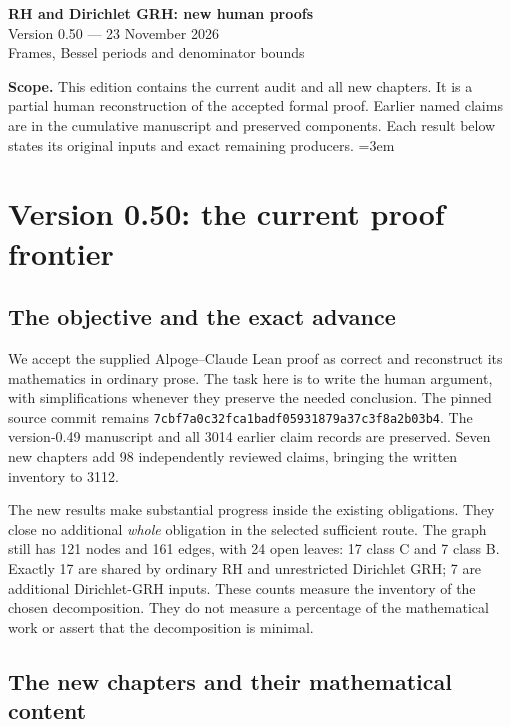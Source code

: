 \documentclass[11pt,a4paper]{article}
\numberwithin{equation}{section}
\theoremstyle{remark}\newtheorem{remark}[theorem]{Remark}
\begin{document}
\begin{center}
{\LARGE\bfseries RH and Dirichlet GRH: new human proofs}\\[7pt]
{\large Version 0.50 --- 23 November 2026}\\[5pt]
{\large Frames, Bessel periods and denominator bounds}
\end{center}
\textbf{Scope.} This edition contains the current audit and all new chapters.
It is a partial human reconstruction of the accepted formal proof.
Earlier named claims are in the cumulative manuscript and preserved components.
Each result below states its original inputs and exact remaining producers.
\setcounter{tocdepth}{1}
\tableofcontents
\clearpage
\begingroup\emergencystretch=3em
\section{Version 0.50: the current proof frontier}
\label{sec:dependency-audit-v50}

\subsection{The objective and the exact advance}

We accept the supplied Alpoge--Claude Lean proof as correct and reconstruct
its mathematics in ordinary prose. The task here is to write the human
argument, with simplifications whenever they preserve the needed conclusion.
The pinned source commit remains
\texttt{7cbf7a0c32fca1badf05931879a37c3f8a2b03b4}.
The version-0.49 manuscript and all 3014 earlier claim records are
preserved. Seven new chapters add 98 independently reviewed claims,
bringing the written inventory to 3112.

The new results make substantial progress inside the existing obligations.
They close no additional \emph{whole} obligation in the selected sufficient
route. The graph still has 121 nodes and 161 edges, with 24 open leaves:
17 class C and 7 class B. Exactly 17 are shared by ordinary RH and
unrestricted Dirichlet GRH; 7 are additional Dirichlet-GRH inputs.
These counts measure the inventory of the chosen decomposition. They do
not measure a percentage of the mathematical work or assert that the
decomposition is minimal.

\subsection{The new chapters and their mathematical content}
\end{document}
